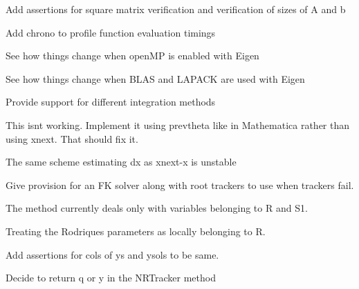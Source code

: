 
\begin{DoxyRefList}
\item[Member \mbox{\hyperlink{utils_8hh_a7ed506e6d7b8ba153e1b8b24a7b6e5c4}{linear\+Solve}} (Matrix\+Xd Amat, Vector\+Xd bvec)]\label{todo__todo000006}%
%
Add assertions for square matrix verification and verification of sizes of A and b  
\item[Class \mbox{\hyperlink{classRootTracker}{Root\+Tracker}} ]\label{todo__todo000005}%
%
Add chrono to profile function evaluation timings 

See how things change when open\+MP is enabled with Eigen 

See how things change when B\+L\+AS and L\+A\+P\+A\+CK are used with Eigen  
\item[Member \mbox{\hyperlink{classRootTracker_acc5d4b8e89ace70cee9c227f033e5a92}{Root\+Tracker::D\+M\+Tracker}} (Vector\+Xd xprev, Vector\+Xd x, Vector\+Xd y, std\+::function$<$ Matrix\+Xd(\+Vector\+Xd)$>$ Jfx, std\+::function$<$ Matrix\+Xd(\+Vector\+Xd)$>$ Jfy, double eps=0, std\+::function$<$ Vector\+Xd(\+Vector\+Xd)$>$ f=N\+U\+LL)]\label{todo__todo000003}%
%
Provide support for different integration methods 

This isnt working. Implement it using prevtheta like in Mathematica rather than using xnext. That should fix it. 

The same scheme estimating dx as xnext-\/x is unstable  
\item[Member \mbox{\hyperlink{classRootTracker_a0d29be3a24392b6a864b8e471f23db6c}{Root\+Tracker::Methods}} ()]\label{todo__todo000001}%
%
Give provision for an FK solver along with root trackers to use when trackers fail.  
\item[Member \mbox{\hyperlink{classRootTracker_ae13e787a2ef083592f5c8d07ac4d08bc}{Root\+Tracker::N\+N\+Tracker}} (Vector\+Xd ys, Matrix\+Xd ysols, int index)]\label{todo__todo000004}%
%
The method currently deals only with variables belonging to R and S1. 

Treating the Rodriques parameters as locally belonging to R. 

Add assertions for cols of ys and ysols to be same.  
\item[Member \mbox{\hyperlink{classRootTracker_a6bb3dcb73ea58ac44ab15d7803de3d5a}{Root\+Tracker::N\+R\+Tracker}} (Vector\+Xd x, Vector\+Xd y, std\+::function$<$ Vector\+Xd(\+Vector\+Xd)$>$ f, std\+::function$<$ Matrix\+Xd(\+Vector\+Xd)$>$ Jfy, double eps=pow(10, -\/10))]\label{todo__todo000002}%
%
Decide to return q or y in the N\+R\+Tracker method 


\end{DoxyRefList}
